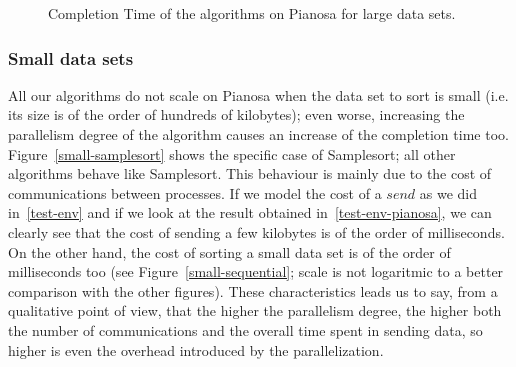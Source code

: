 \begin{figure}[p]
	\centering
  	\hspace*{20pt}
  	
	\caption{Completion Time of the algorithms on Pianosa for large data sets.}
	\label{large-tc}
\end{figure}

\subsubsection*{Small data sets}
All our algorithms do not scale on Pianosa when the data set to sort is small (i.e. its size is of the order of hundreds of kilobytes); even worse, increasing the parallelism degree of the algorithm causes an increase of the completion time too. Figure~\ref{small-samplesort} shows the specific case of Samplesort; all other algorithms behave like Samplesort. This behaviour is mainly due to the cost of communications between processes. If we model the cost of a $send$ as we did in~\ref{test-env} and if we look at the result obtained in~\ref{test-env-pianosa}, we can clearly see that the cost of sending a few kilobytes is of the order of milliseconds. On the other hand, the cost of sorting a small data set is of the order of milliseconds too (see Figure~\ref{small-sequential}; scale is not logaritmic to a better comparison with the other figures). These characteristics leads us to say, from a qualitative point of view, that the higher the parallelism degree, the higher both the number of communications and the overall time spent in sending data, so higher is even the overhead introduced by the parallelization. 

